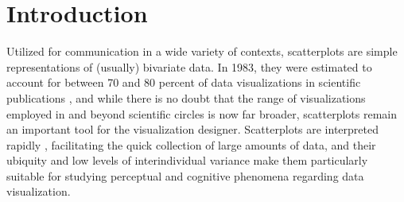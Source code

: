 \documentclass[manuscript,screen,review,anonymous]{acmart}
\begin{document}



\maketitle

\setlength{\parskip}{-0.1pt}

\section{Introduction}\label{sec-intro}

Utilized for communication in a wide variety of contexts, scatterplots
are simple representations of (usually) bivariate data. In 1983, they
were estimated to account for between 70 and 80 percent of data
visualizations in scientific publications \citep{tufte_1983}, and while
there is no doubt that the range of visualizations employed in and
beyond scientific circles is now far broader, scatterplots remain an
important tool for the visualization designer. Scatterplots are
interpreted rapidly \citep{rensink_2014}, facilitating the quick
collection of large amounts of data, and their ubiquity
\citep{tufte_1983} and low levels of interindividual variance
\citep{kay_2015} make them particularly suitable for studying perceptual
and cognitive phenomena regarding data visualization.
\end{document}
